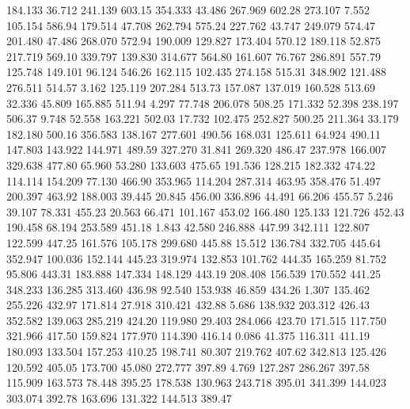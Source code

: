  184.133   36.712  241.139       603.15
 354.333   43.486  267.969       602.28
 273.107    7.552  105.154       586.94
 179.514   47.708  262.794       575.24
 227.762   43.747  249.079       574.47
 201.480   47.486  268.070       572.94
 190.009  129.827  173.404       570.12
 189.118   52.875  217.719       569.10
 339.797  139.830  314.677       564.80
 161.607   76.767  286.891       557.79
 125.748  149.101   96.124       546.26
 162.115  102.435  274.158       515.31
 348.902  121.488  276.511       514.57
   3.162  125.119  207.284       513.73
 157.087  137.019  160.528       513.69
  32.336   45.809  165.885       511.94
   4.297   77.748  206.078       508.25
 171.332   52.398  238.197       506.37
   9.748   52.558  163.221       502.03
  17.732  102.475  252.827       500.25
 211.364   33.179  182.180       500.16
 356.583  138.167  277.601       490.56
 168.031  125.611   64.924       490.11
 147.803  143.922  144.971       489.59
 327.270   31.841  269.320       486.47
 237.978  166.007  329.638       477.80
  65.960   53.280  133.603       475.65
 191.536  128.215  182.332       474.22
 114.114  154.209   77.130       466.90
 353.965  114.204  287.314       463.95
 358.476   51.497  200.397       463.92
 188.003   39.445   20.845       456.00
 336.896   44.491   66.206       455.57
   5.246   39.107   78.331       455.23
  20.563   66.471  101.167       453.02
 166.480  125.133  121.726       452.43
 190.458   68.194  253.589       451.18
   1.843   42.580  246.888       447.99
 342.111  122.807  122.599       447.25
 161.576  105.178  299.680       445.88
  15.512  136.784  332.705       445.64
 352.947  100.036  152.144       445.23
 319.974  132.853  101.762       444.35
 165.259   81.752   95.806       443.31
 183.888  147.334  148.129       443.19
 208.408  156.539  170.552       441.25
 348.233  136.285  313.460       436.98
  92.540  153.938   46.859       434.26
   1.307  135.462  255.226       432.97
 171.814   27.918  310.421       432.88
   5.686  138.932  203.312       426.43
 352.582  139.063  285.219       424.20
 119.980   29.403  284.066       423.70
 171.515  117.750  321.966       417.50
 159.824  177.970  114.390       416.14
   0.086   41.375  116.311       411.19
 180.093  133.504  157.253       410.25
 198.741   80.307  219.762       407.62
 342.813  125.426  120.592       405.05
 173.700   45.080  272.777       397.89
   4.769  127.287  286.267       397.58
 115.909  163.573   78.448       395.25
 178.538  130.963  243.718       395.01
 341.399  144.023  303.074       392.78
 163.696  131.322  144.513       389.47
